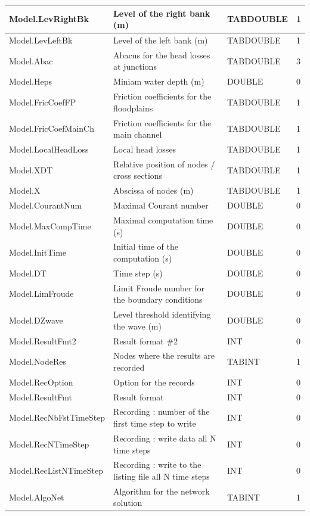 \documentclass[a4paper,11pt]{article}
\begin{document}
\begin{landscape}
\begin{table}[ht]
\begin{center}
\begin{tabular}{|l|l|l|l|}
\hline  Model.LevRightBk & Level of the right bank (m) & TABDOUBLE & 1 \\
\hline  Model.LevLeftBk & Level of the left bank (m) & TABDOUBLE & 1 \\
\hline  Model.Abac & Abacus for the head losses at junctions & TABDOUBLE & 3 \\
\hline  Model.Heps & Miniam water depth (m) & DOUBLE & 0 \\
\hline  Model.FricCoefFP & Friction coefficients for the floodplains & TABDOUBLE & 1 \\
\hline  Model.FricCoefMainCh & Friction coefficients for the main channel & TABDOUBLE & 1 \\
\hline  Model.LocalHeadLoss & Local head losses & TABDOUBLE & 1 \\
\hline  Model.XDT & Relative position of nodes / cross sections & TABDOUBLE & 1 \\
\hline  Model.X & Abscissa of nodes (m) & TABDOUBLE & 1 \\
\hline  Model.CourantNum & Maximal Courant number & DOUBLE & 0 \\
\hline  Model.MaxCompTime & Maximal computation time (s) & DOUBLE & 0 \\
\hline  Model.InitTime & Initial time of the computation (s) & DOUBLE & 0 \\
\hline  Model.DT & Time step (s) & DOUBLE & 0 \\
\hline  Model.LimFroude & Limit Froude number for the boundary conditions & DOUBLE & 0 \\
\hline  Model.DZwave & Level threshold identifying the wave (m) & DOUBLE & 0 \\
\hline  Model.ResultFmt2 & Result format \#2 & INT & 0 \\
\hline  Model.NodeRes & Nodes where the results are recorded & TABINT & 1 \\
\hline  Model.RecOption & Option for the records & INT & 0 \\
\hline  Model.ResultFmt & Result format & INT & 0 \\
\hline  Model.RecNbFstTimeStep & Recording : number of the first time step to write & INT & 0 \\
\hline  Model.RecNTimeStep & Recording : write data all N time steps & INT & 0 \\
\hline  Model.RecListNTimeStep & Recording : write to the listing file all N time steps & INT & 0 \\
\hline  Model.AlgoNet & Algorithm for the network solution & TABINT & 1 \\

\end{tabular}
\end{center}
\end{table}
\end{landscape}
\end{document}
